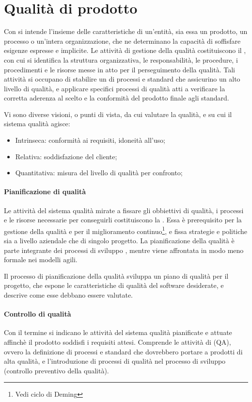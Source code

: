 \section{Qualità di prodotto}
Con  si intende l'insieme delle caratteristiche di un'entità, sia essa un prodotto, un processo o un'intera organizzazione, che ne determinano la capacità di soffisfare esigenze espresse e implicite. Le attività di gestione della qualità costituiscono il , con cui si identifica la struttura organizzativa, le responsabilità, le procedure, i procedimenti e le risorse messe in atto per il perseguimento della qualità. Tali attività  si occupano di stabilire un  di processi e standard che assicurino un alto livello di qualità, e applicare specifici processi di qualità atti a verificare la corretta aderenza al  scelto e la conformità del prodotto finale agli standard.

Vi sono diverse visioni, o punti di vista, da cui valutare la qualità, e su cui il sistema qualità agisce:
\begin{itemize}
	\item Intrinseca: conformità ai requisiti, idoneità all'uso;
	\item Relativa: soddisfazione del cliente;
	\item Quantitativa: misura del livello di qualità per confronto;
\end{itemize}

\paragraph{Pianificazione di qualità}
Le attività del sistema qualità mirate a fissare gli obbiettivi di qualità, i processi e le risorse necessarie per conseguirli costituiscono la . Essa è prerequisito per la gestione della qualità e per il miglioramento continuo\footnote{Vedi ciclo di Deming}, e fissa strategie e politiche sia a livello aziendale che di singolo progetto. La pianificazione della qualità è parte integrante dei processi di sviluppo , mentre viene affrontata in modo meno formale nei modelli agili.

Il processo di pianificazione della qualità sviluppa un piano di qualità per il progetto, che espone le caratteristiche di qualità del software desiderate, e descrive come esse debbano essere valutate. 

\paragraph{Controllo di qualità}
Con il termine  si indicano le attività del sistema qualità pianificate e attuate affinchè il prodotto soddisfi i requisiti attesi. Comprende le attività di  (QA), ovvero la definizione di processi e standard che dovrebbero portare a prodotti di alta qualità, e l'introduzione di processi di qualità nel processo di sviluppo (controllo preventivo della qualità).

